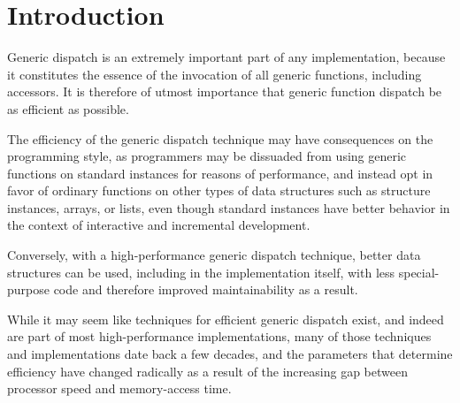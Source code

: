 \section{Introduction}

Generic dispatch is an extremely important part of any \cl{}
implementation, because it constitutes the essence of the invocation
of all generic functions, including accessors.  It is therefore of
utmost importance that generic function dispatch be as efficient as
possible. 

The efficiency of the generic dispatch technique may have consequences
on the programming style, as programmers may be dissuaded from using
generic functions on standard instances for reasons of performance,
and instead opt in favor of ordinary functions on other types of data
structures such as structure instances, arrays, or lists, even though
standard instances have better behavior in the context of interactive
and incremental development.

Conversely, with a high-performance generic dispatch technique, better
data structures can be used, including in the implementation itself,
with less special-purpose code and therefore improved maintainability
as a result.

While it may seem like techniques for efficient generic dispatch
exist, and indeed are part of most high-performance \cl{}
implementations, many of those techniques and implementations date
back a few decades, and the parameters that determine efficiency have
changed radically as a result of the increasing gap between processor
speed and memory-access time.
